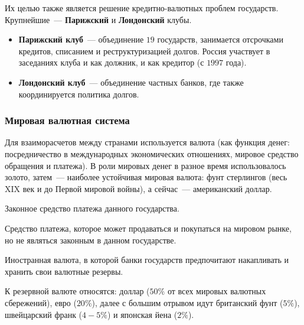 \documentclass[12pt]{article}
\begin{document}
    \begin{note}
    	Их целью также является решение кредитно-валютных проблем государств. Крупнейшие~--- \textbf{Парижский} и \textbf{Лондонский} клубы.
    	
    	\begin{itemize}
    		\item \textbf{Парижский клуб}~--- объединение $19$ государств, занимается отсрочками кредитов, списанием и реструктуризацией долгов. Россия участвует в заседаниях клуба и как должник, и как кредитор (с $1997$ года).
    		\item \textbf{Лондонский клуб}~--- объединение частных банков, где также координируется политика долгов.
    	\end{itemize}
    \end{note}
    
    \subsubsection{Мировая валютная система}
    
    \begin{note}
    	Для взаиморасчетов между странами используется валюта (как функция денег: посредничество в международных экономических отношениях, мировое средство обращения и платежа). В роли мировых денег в разное время использовалось золото, затем~--- наиболее устойчивая мировая валюта: фунт стерлингов (весь XIX век и до Первой мировой войны), а сейчас~--- американский доллар.
    \end{note}
    
    \begin{definition}
    	Законное средство платежа данного государства.
    \end{definition}
    
    \begin{definition}
    	Средство платежа, которое может продаваться и покупаться на мировом рынке, но не являться законным в данном государстве.
    \end{definition}
    
    \begin{definition}
    	Иностранная валюта, в которой банки государств предпочитают накапливать и хранить свои валютные резервы.
    \end{definition}
    
    \begin{note}
    	К резервной валюте относятся: доллар ($50\%$ от всех мировых валютных сбережений), евро ($20\%$), далее с большим отрывом идут британский фунт ($5\%$), швейцарский франк ($4-5\%$) и японская йена ($2\%$).
    \end{note}
    
\end{document}
